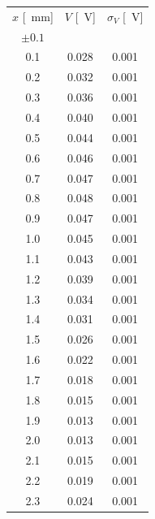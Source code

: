 \documentclass[10pt,oneside,a4paper]{article}
\begin{document}
\vspace{1cm}

\label{tab:interaFenditura}
\begin{minipage}{0.33\linewidth}
\begin{center}
\begin{tabular}{c|c|c}
$x$ [\SI{}{mm}] & $V$ [\SI{}{V}] & $\sigma_V$ [\SI{}{V}] \\
 $\pm 0.1$ & & \\
\hline
 0.1 & 0.028 & 0.001 \\
  0.2 & 0.032 & 0.001 \\
  0.3 & 0.036 & 0.001 \\
  0.4 & 0.040 & 0.001 \\
  0.5 & 0.044 & 0.001 \\
  0.6 & 0.046 & 0.001 \\
  0.7 & 0.047 & 0.001 \\
  0.8 & 0.048 & 0.001 \\
  0.9 & 0.047 & 0.001 \\
  1.0 & 0.045 & 0.001 \\
  1.1 & 0.043 & 0.001 \\
  1.2 & 0.039 & 0.001 \\
  1.3 & 0.034 & 0.001 \\
  1.4 & 0.031 & 0.001 \\
  1.5 & 0.026 & 0.001 \\
  1.6 & 0.022 & 0.001 \\
  1.7 & 0.018 & 0.001 \\
  1.8 & 0.015 & 0.001 \\
  1.9 & 0.013 & 0.001 \\
  2.0 & 0.013 & 0.001 \\
  2.1 & 0.015 & 0.001 \\
  2.2 & 0.019 & 0.001 \\
  2.3 & 0.024 & 0.001 \\
\hline
\end{tabular}
\end{center}
\end{minipage}
\end{document}
